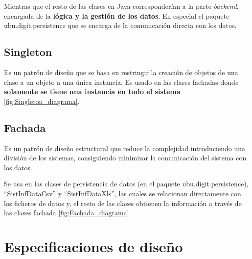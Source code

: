Mientras que el resto de las clases en Java corresponderían a la parte \emph{backend}, encargada de la \textbf{lógica y la gestión de los datos}. En especial el paquete ubu.digit.persistence que se encarga de la comunicación directa con los datos. 

\subsection{Singleton}
Es un patrón de diseño que se basa en restringir la creación de objetos de una clase a un objeto a una única instancia. Es usado en las clases fachadas donde \textbf{solamente se tiene una instancia en todo el sistema} \ref{fig:Singleton_diagrama}.


\subsection{Fachada}
Es un patrón de diseño estructural que reduce la complejidad introduciendo una división de los sistemas, consiguiendo minimizar la comunicación del sistema con los datos. 

Se usa en las clases de persistencia de datos (en el paquete ubu.digit.persistence), ``SistInfDataCsv'' y ``SistInfDataXls'', las cuales se relacionan directamente con los ficheros de datos y, el resto de las clases obtienen la información a través de las clases fachada \ref{fig:Fachada_diagrama}.


\section{Especificaciones de diseño}


